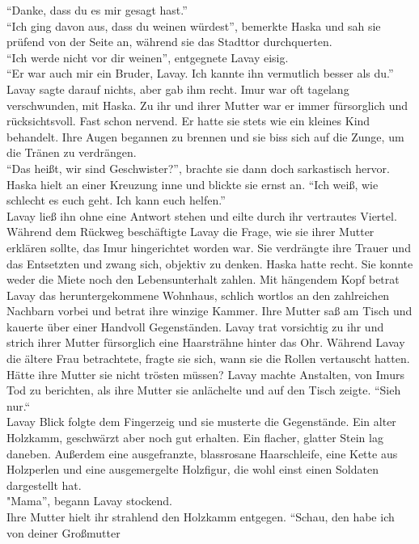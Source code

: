 ``Danke, dass du es mir gesagt hast.''\\
``Ich ging davon aus, dass du weinen würdest'', bemerkte Haska und sah sie prüfend von der Seite 
an, während sie das Stadttor durchquerten.\\
``Ich werde nicht vor dir weinen'', entgegnete Lavay eisig. \\
``Er war auch mir ein Bruder, Lavay. Ich kannte ihn vermutlich besser als du.''\\
Lavay sagte darauf nichts, aber gab ihm recht. Imur war oft tagelang verschwunden, mit Haska. Zu 
ihr und ihrer Mutter war er immer fürsorglich und rücksichtsvoll. Fast schon nervend. Er hatte sie 
stets wie ein kleines Kind behandelt. Ihre Augen begannen zu brennen und sie biss sich auf die 
Zunge, um die Tränen zu verdrängen.\\
``Das heißt, wir sind Geschwister?'', brachte sie dann doch sarkastisch hervor.\\
Haska hielt an einer Kreuzung inne und blickte sie ernst an. ``Ich weiß, wie schlecht es euch geht. 
Ich kann euch helfen.''\\
Lavay ließ ihn ohne eine Antwort stehen und eilte durch ihr vertrautes Viertel. Während dem Rückweg 
beschäftigte Lavay die Frage, wie sie ihrer Mutter erklären sollte, das Imur hingerichtet worden 
war. Sie verdrängte ihre Trauer und das Entsetzten und zwang sich, objektiv zu denken. Haska hatte 
recht. Sie konnte weder die Miete noch den Lebensunterhalt zahlen. Mit hängendem Kopf betrat Lavay 
das heruntergekommene Wohnhaus, schlich wortlos an den zahlreichen Nachbarn vorbei und betrat ihre 
winzige Kammer. Ihre Mutter saß am Tisch und kauerte über einer Handvoll Gegenständen. Lavay trat 
vorsichtig zu ihr und strich ihrer Mutter fürsorglich eine Haarsträhne hinter das Ohr. Während Lavay 
die ältere Frau betrachtete, fragte sie sich, wann sie die Rollen vertauscht hatten. Hätte ihre 
Mutter sie nicht trösten müssen? Lavay machte Anstalten, von Imurs Tod zu berichten, als ihre Mutter 
sie anlächelte und auf den Tisch zeigte. ``Sieh nur.``\\
Lavay Blick folgte dem Fingerzeig und sie musterte die Gegenstände. Ein alter Holzkamm, geschwärzt 
aber noch gut erhalten. Ein flacher, glatter Stein lag daneben. Außerdem eine ausgefranzte, 
blassrosane Haarschleife, eine Kette aus Holzperlen und eine ausgemergelte Holzfigur, die wohl 
einst einen Soldaten dargestellt hat.\\
"Mama'', begann Lavay stockend.\\
Ihre Mutter hielt ihr strahlend den Holzkamm entgegen. ``Schau, den habe ich von deiner Großmutter 
